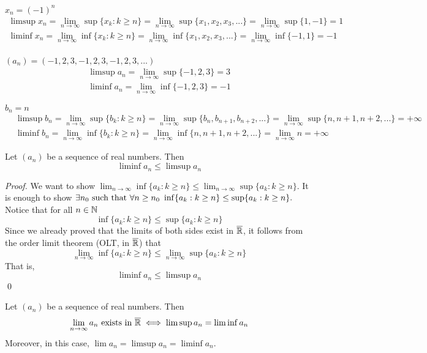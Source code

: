 \begin{example}
    $x_n = (-1)^n$
    \begin{align*}
        \limsup x_n = \lim_{n \to \infty} \sup \{x_k : k \geq n\} = \lim_{n \to \infty} \sup \{x_1, x_2, x_3,...\} = \lim_{n \to \infty} \sup\{1,-1\} = 1 \\
        \liminf x_n = \lim_{n \to \infty} \inf \{x_k : k \geq n\} = \lim_{n \to \infty} \inf \{x_1, x_2, x_3,...\} = \lim_{n \to \infty} \inf\{-1,1\} = -1 \\
    \end{align*}

    $(a_n) = (-1, 2, 3, -1, 2, 3, -1, 2, 3,...)$
    \begin{align*}
        \limsup a_n = \lim_{n \to \infty} \sup \{-1, 2, 3\} = 3 \\
        \liminf a_n = \lim_{n \to \infty} \inf \{-1, 2, 3\} = -1
    \end{align*}

    $b_n = n$
    \begin{align*}
        &\limsup b_n = \lim_{n \to \infty} \sup \{b_k : k \geq n\} = \lim_{n \to \infty} \sup \{b_n, b_{n+1}, b_{n+2},...\} = \lim_{n \to \infty} \sup\{n,n+1, n+2,...\} = +\infty \\
        &\liminf b_n = \lim_{n \to \infty} \inf \{b_k : k \geq n\} = \lim_{n \to \infty} \inf\{n,n+1, n+2,...\} = \lim_{n\to \infty} n = +\infty
    \end{align*}
\end{example}

\begin{theorem}
    \label{limsup<liminf}
    Let $(a_n)$ be a sequence of real numbers. Then
    $$\liminf a_n \leq \limsup a_n$$
\end{theorem}
\begin{proof}
    We want to show $\lim_{n\to \infty} \inf \{a_k : k \geq n\} \leq \lim_{n \to \infty} \sup \{a_k : k \geq n\}$. It is enough to show $\exists n_0 \text{ such that } \forall n \geq n_0 ~\inf \{a_k: k \geq n \} \leq \sup \{a_k : k \geq n\}.$
    Notice that for all $n\in \mathbb{N}$
    $$\inf \{a_k : k \geq n\} \leq \sup \{a_k : k \geq n\}$$
    Since we already proved that the limits of both sides exist in $\overline{\mathbb{R}}$, it follows from the order limit theorem (OLT, in $\overline{\mathbb{R}}$) that
    $$\lim_{n\to\infty}\inf \{a_k : k \geq n\} \leq \lim_{n\to\infty} \sup\{a_k : k \geq n\}$$
    That is,
    $$\liminf a_n \leq \limsup a_n$$
    \qed
\end{proof}

\begin{theorem}
    Let $(a_n)$ be a sequence of real numbers. Then
    $$\lim_{n\to\infty}a_n \text{ exists in $\overline{\mathbb{R}}$} \iff \limsup a_n = \liminf a_n$$
    Moreover, in this case, $\lim a_n = \limsup a_n = \liminf a_n$.
\end{theorem}

